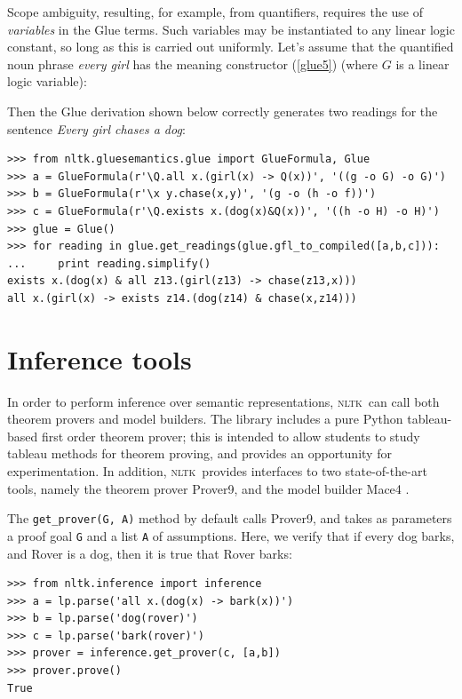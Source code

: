 \documentclass[11pt, a4paper]{article}
\newcommand{\NLTK}{\textsc{nltk}}
\begin{document}
Scope ambiguity, resulting, for example, from quantifiers, requires the
use of \textit{variables} in the Glue terms. Such variables may be
instantiated to any linear logic constant, so long as this is carried
out uniformly. Let's assume that the quantified noun phrase
\textit{every girl} has the meaning constructor (\ref{glue5}) (where
$G$ is a linear logic variable):

Then the Glue derivation shown below correctly
generates two readings for the sentence \textit{Every girl chases a dog}:
\begin{Verbatim}
>>> from nltk.gluesemantics.glue import GlueFormula, Glue
>>> a = GlueFormula(r'\Q.all x.(girl(x) -> Q(x))', '((g -o G) -o G)')
>>> b = GlueFormula(r'\x y.chase(x,y)', '(g -o (h -o f))')
>>> c = GlueFormula(r'\Q.exists x.(dog(x)&Q(x))', '((h -o H) -o H)')
>>> glue = Glue()
>>> for reading in glue.get_readings(glue.gfl_to_compiled([a,b,c])):
...     print reading.simplify()
exists x.(dog(x) & all z13.(girl(z13) -> chase(z13,x)))
all x.(girl(x) -> exists z14.(dog(z14) & chase(x,z14)))
\end{Verbatim}


\section{Inference tools}
In order to perform inference over semantic representations, \NLTK\
can call both theorem provers and model builders.
The library includes a pure Python tableau-based first order theorem prover;
this is intended to allow students to study 
tableau methods for theorem proving, and provides an
opportunity for experimentation.  In addition, \NLTK\ provides
interfaces to two state-of-the-art tools, namely the theorem prover Prover9, 
and the model builder Mace4  \citep{McCune}.  %

The \verb!get_prover(G, A)! method by default calls Prover9, and takes as
parameters a proof goal \texttt{G} and a list \texttt{A} of assumptions.
Here, we verify that if every dog barks, and Rover is a dog,
then it is true that Rover barks:
\begin{Verbatim}
>>> from nltk.inference import inference
>>> a = lp.parse('all x.(dog(x) -> bark(x))')
>>> b = lp.parse('dog(rover)')
>>> c = lp.parse('bark(rover)')
>>> prover = inference.get_prover(c, [a,b])
>>> prover.prove()
True
\end{Verbatim}
\end{document}
